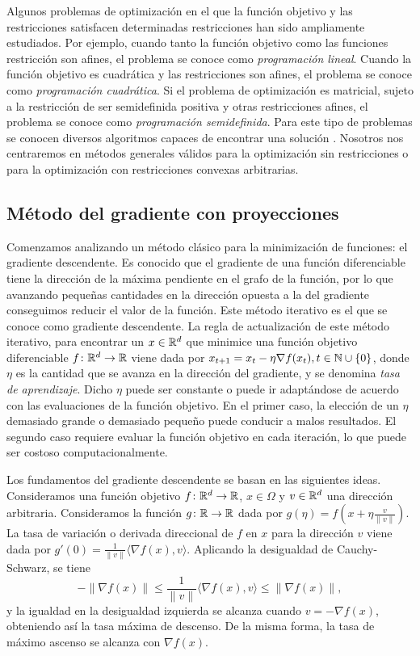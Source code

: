 \documentclass{book}
\begin{document}
Algunos problemas de optimización en el que la función objetivo y las restricciones satisfacen determinadas restricciones han sido ampliamente estudiados. Por ejemplo, cuando tanto la función objetivo como las funciones restricción son afines, el problema se conoce como \emph{programación lineal}. Cuando la función objetivo es cuadrática y las restricciones son afines, el problema se conoce como \emph{programación cuadrática}. Si el problema de optimización es matricial, sujeto a la restricción de ser semidefinida positiva y otras restricciones afines, el problema se conoce como \emph{programación semidefinida}. Para este tipo de problemas se conocen diversos algoritmos capaces de encontrar una solución \cite{convexoptimization}. Nosotros nos centraremos en métodos generales válidos para la optimización sin restricciones o para la optimización con restricciones convexas arbitrarias.

\subsection{Método del gradiente con proyecciones}

Comenzamos analizando un método clásico para la minimización de funciones: el gradiente descendente. Es conocido que el gradiente de una función diferenciable tiene la dirección de la máxima pendiente en el grafo de la función, por lo que avanzando pequeñas cantidades en la dirección opuesta a la del gradiente conseguimos reducir el valor de la función. Este método iterativo es el que se conoce como gradiente descendente. La regla de actualización de este método iterativo, para encontrar un $x \in \mathbb{R}^d$ que minimice una función objetivo diferenciable $f \colon \mathbb{R}^d \to \mathbb{R}$ viene dada por $x_{t+1} = x_t - \eta \nabla f(x_t), t \in \mathbb{N} \cup\{0\}$, donde $\eta$ es la cantidad que se avanza en la dirección del gradiente, y se denomina \emph{tasa de aprendizaje}. Dicho $\eta$ puede ser constante o puede ir adaptándose de acuerdo con las evaluaciones de la función objetivo. En el primer caso, la elección de un $\eta$ demasiado grande o demasiado pequeño puede conducir a malos resultados. El segundo caso requiere evaluar la función objetivo en cada iteración, lo que puede ser costoso computacionalmente.

Los fundamentos del gradiente descendente se basan en las siguientes ideas. Consideramos una función objetivo $f \colon \mathbb{R}^d \to \mathbb{R}$, $x \in \Omega$ y $v \in \mathbb{R}^d$ una dirección arbitraria. Consideramos la función $g \colon \mathbb{R} \to \mathbb{R}$ dada por $g(\eta) = f(x + \eta \frac{v}{\|v\|})$. La tasa de variación o derivada direccional de $f$ en $x$ para la dirección $v$ viene dada por $g'(0) = \frac{1}{\|v\|}\langle \nabla f(x), v \rangle$. Aplicando la desigualdad de Cauchy-Schwarz, se tiene
\[  -\|\nabla f(x)\| \le \frac{1}{\|v\|}\langle \nabla f(x), v \rangle \le \|\nabla f(x)\|,\]
y la igualdad en la desigualdad izquierda se alcanza cuando $v = - \nabla f(x)$, obteniendo así la tasa máxima de descenso. De la misma forma, la tasa de máximo ascenso se alcanza con $\nabla f(x)$.
\end{document}
